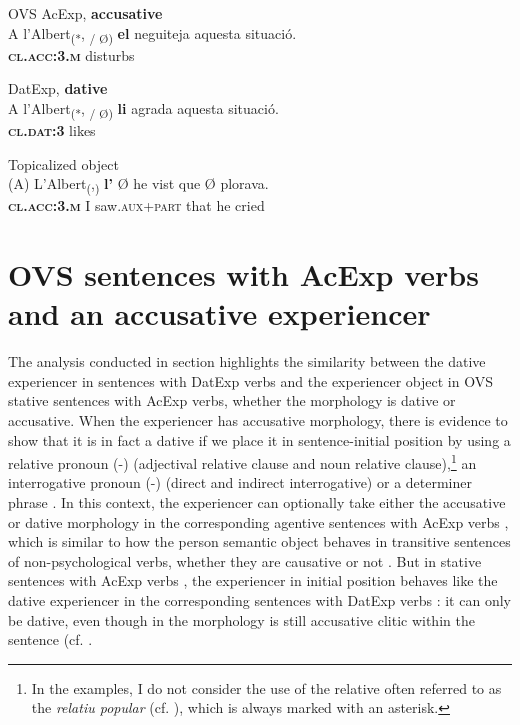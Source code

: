 \documentclass[output=paper,colorlinks,citecolor=brown,modfonts,nonflat]{langsci/langscibook}
\begin{document}
 \ex OVS AcExp, \textbf{accusative}\label{ex:royo:13b}\\
 \gll A l’Albert\textsubscript{(*}, \textsubscript{/ Ø)} \textbf{el} neguiteja aquesta situació.\\
  \textbf{\textsc{cl.acc:3.m}} disturbs \\
\glt {}
 
 \ex DatExp, \textbf{dative}\label{ex:royo:13c}\\
 \gll A l’Albert\textsubscript{(*}, \textsubscript{/ Ø)} \textbf{li} agrada aquesta situació.\\
  \textbf{\textsc{cl.dat:3}} likes \\
\glt {}
 
 \ex Topicalized object\label{ex:royo:13d}\\
 \gll (A) L’Albert\textsubscript{(},\textsubscript{)} \textbf{l’} Ø he vist que Ø plorava.\\
 \textbf{\textsc{cl.acc:3.m}} I saw.\textsc{aux+part} that he cried \\
\glt {}
 \z
 \z


\section{OVS sentences with AcExp verbs and an accusative experiencer}\label{sec:royo:4}

The analysis conducted in section  highlights the similarity between the dative experiencer in sentences with DatExp verbs and the experiencer object in OVS stative sentences with AcExp verbs, whether the morphology is dative or accusative. When the experiencer has accusative morphology, there is evidence to show that it is in fact a dative if we place it in sentence-initial position by using a relative pronoun (-) (adjectival relative clause and noun relative clause),\footnote{In the examples, I do not consider the use of the relative often referred to as the \textit{relatiu popular} (cf. \citealt[154--155]{Ginebra2005}), which is always marked with an asterisk.} an interrogative pronoun (-) (direct and indirect interrogative) or a determiner phrase . In this context, the experiencer can optionally take either the accusative or dative morphology in the corresponding agentive sentences with AcExp verbs , which is similar to how the person semantic object behaves in transitive sentences of non-psychological verbs, whether they are causative or not . But in stative sentences with AcExp verbs , the experiencer in initial position behaves like the dative experiencer in the corresponding sentences with DatExp verbs : it can only be dative, even though in  the morphology is still accusative clitic within the sentence (cf. \citealt[Section 4.3.4]{Royo2017}.
\end{document}
